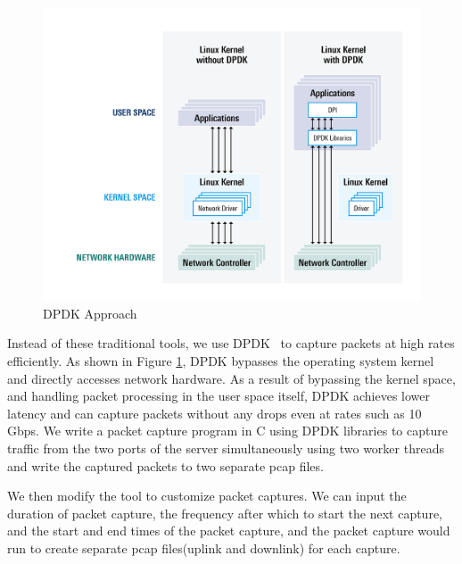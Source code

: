 \begin{figure}[t]
    \centering
        \includegraphics[width=\textwidth]{Figures/dpdk.png}
    \caption[DPDK Approach]{DPDK Approach ~\cite{dpdk2023}}
    \label{fig:dpdk}
    \bigskip
\end{figure}

Instead of these traditional tools, we use DPDK~\cite{dpdk} to capture packets at high rates efficiently. As shown in Figure \ref{fig:dpdk}, DPDK bypasses the operating system kernel and directly accesses network hardware. As a result of bypassing the kernel space, and handling packet processing in the user space itself, DPDK achieves lower latency and can capture packets without any drops even at rates such as 10 Gbps. We write a packet capture program in C using DPDK libraries to capture traffic from the two ports of the server simultaneously using two worker threads and write the captured packets to two separate pcap files.

We then modify the tool to customize packet captures. We can input the duration of packet capture, the frequency after which to start the next capture, and the start and end times of the packet capture, and the packet capture would run to create separate pcap files(uplink and downlink) for each capture.
